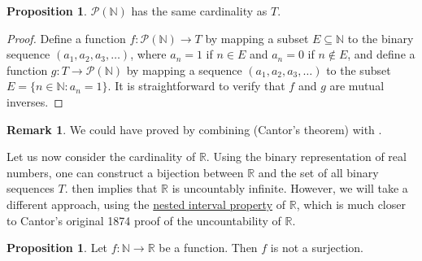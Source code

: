 \documentclass[12pt]{article}
\theoremstyle{definition}
\newtheorem{proposition}[definition]{Proposition}
\newtheorem*{remark}{Remark}
\begin{document}
\begin{proposition}
\label{prop:set_of_binary_sequences_in_bijection_with_power_set_of_naturals}
    \( \mathscr{P}(\mathbb{N}) \) has the same cardinality as \( T \).
\end{proposition}

\begin{proof}
    Define a function \( f : \mathscr{P}(\mathbb{N}) \to T \) by mapping a subset \( E \subseteq \mathbb{N} \) to the binary sequence \( (a_1, a_2, a_3, \ldots) \), where \( a_n = 1 \) if \( n \in E \) and \( a_n = 0 \) if \( n \not\in E \), and define a function \( g : T \to \mathscr{P}(\mathbb{N}) \) by mapping a sequence \( (a_1, a_2, a_3, \ldots) \) to the subset \( E = \{ n \in \mathbb{N} : a_n = 1 \} \). It is straightforward to verify that \( f \) and \( g \) are mutual inverses.
\end{proof}

\begin{remark}
    We could have proved  by combining  (Cantor's theorem) with .
\end{remark}

Let us now consider the cardinality of \( \mathbb{R} \). Using the binary representation of real numbers, one can construct a bijection between \( \mathbb{R} \) and the set of all binary sequences \( T \).  then implies that \( \mathbb{R} \) is uncountably infinite. However, we will take a different approach, using the \href{https://lew98.github.io/Mathematics/Miscellaneous/Nested_interval_property.pdf}{nested interval property} of \( \mathbb{R} \), which is much closer to Cantor's original 1874 proof of the uncountability of \( \mathbb{R} \).

\begin{proposition}
\label{prop:no_surjection_from_N_to_R}
    Let \( f : \mathbb{N} \to \mathbb{R} \) be a function. Then \( f \) is not a surjection.
\end{proposition}
\end{document}
